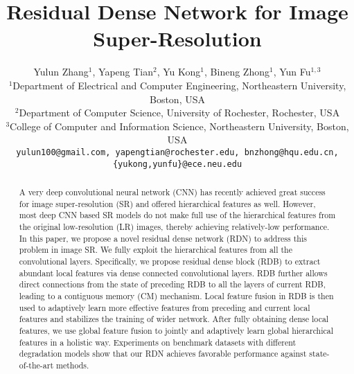 \documentclass[10pt,twocolumn,letterpaper]{article}
\begin{document}
\title{Residual Dense Network for Image Super-Resolution}

\author{Yulun Zhang$^{1}$, Yapeng Tian$^{2}$, Yu Kong$^{1}$, Bineng Zhong$^{1}$, Yun Fu$^{1,3}$\\
$^{1}$Department of Electrical and Computer Engineering, Northeastern University, Boston, USA\\
$^{2}$Department of Computer Science, University of Rochester, Rochester, USA\\
$^{3}$College of Computer and Information Science, Northeastern University, Boston, USA\\
{\tt\small yulun100@gmail.com, yapengtian@rochester.edu, bnzhong@hqu.edu.cn, \{yukong,yunfu\}@ece.neu.edu}
}

\maketitle


\begin{abstract}
A very deep convolutional neural network (CNN) has recently achieved great success for image super-resolution (SR) and offered hierarchical features as well. However, most deep CNN based SR models do not make full use of the hierarchical features from the original low-resolution (LR) images, thereby achieving relatively-low performance. In this paper, we propose a novel residual dense network (RDN) to address this problem in image SR. We fully exploit the hierarchical features from all the convolutional layers. Specifically, we propose residual dense block (RDB) to extract abundant local features via dense connected convolutional layers. RDB further allows direct connections from the state of preceding RDB to all the layers of current RDB, leading to a contiguous memory (CM) mechanism. Local feature fusion in RDB is then used to adaptively learn more effective features from preceding and current local features and stabilizes the training of wider network. After fully obtaining dense local features, we use global feature fusion to jointly and adaptively learn global hierarchical features in a holistic way. Experiments on benchmark datasets with different degradation models show that our RDN achieves favorable performance against state-of-the-art methods.
\end{abstract}
\end{document}
